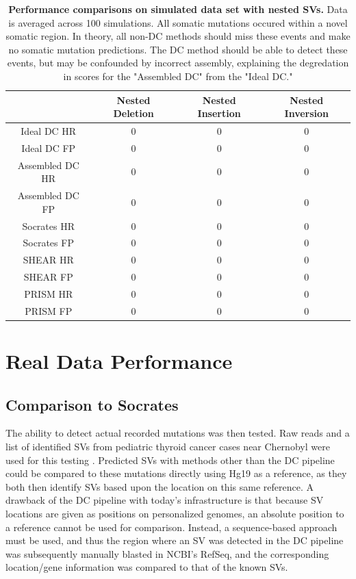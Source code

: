 \documentclass{easychithesis}
\begin{document}
\begin{table}[h]
\begin{center}
\begin{tabular}{|c|c|c|c|}\hline
         & Nested Deletion & Nested Insertion & Nested Inversion\\
        \hline 
        Ideal DC HR & 0 & 0 & 0\\
        Ideal DC FP & 0 & 0 & 0\\
        \hline 
        Assembled DC HR & 0 & 0 & 0\\
        Assembled DC FP & 0 & 0 & 0\\
        \hline
        Socrates HR & 0 & 0 & 0\\
        Socrates FP & 0 & 0 & 0\\
        \hline
        SHEAR HR & 0 & 0 & 0\\
        SHEAR FP & 0 & 0 & 0\\
        \hline
        PRISM HR & 0 & 0 & 0\\
        PRISM FP & 0 & 0 & 0\\
	\hline
\end{tabular}
\caption{{\bf Performance comparisons on simulated data set with nested SVs.} Data is averaged across 100 simulations. All somatic mutations occured within a novel somatic region. In theory, all non-DC methods should miss these events and make no somatic mutation predictions. The DC method should be able to detect these events, but may be confounded by incorrect assembly, explaining the degredation in scores for the "Assembled DC" from the "Ideal DC."}
\end{center}
\end{table}


\section{Real Data Performance}
\subsection{Comparison to Socrates}

The ability to detect actual recorded mutations was then tested. Raw reads and a list of identified SVs from pediatric thyroid cancer cases near Chernobyl were used for this testing \cite{ricarte2013identification}. Predicted SVs with methods other than the DC pipeline could be compared to these mutations directly using Hg19 as a reference, as they both then identify SVs based upon the location on this same reference. A drawback of the DC pipeline with today's infrastructure is that because SV locations are given as positions on personalized genomes, an absolute position to a reference cannot be used for comparison. Instead, a sequence-based approach must be used, and thus the region where an SV was detected in the DC pipeline was subsequently manually blasted in NCBI's RefSeq, and the corresponding location/gene information was compared to that of the known SVs.
\end{document}
